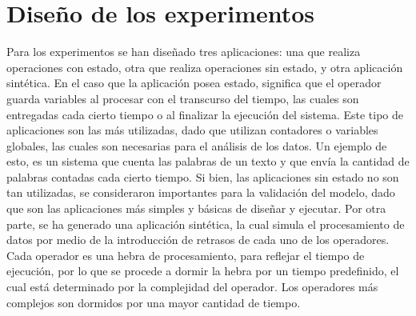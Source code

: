 

\section{Diseño de los experimentos}
Para los experimentos se han diseñado tres aplicaciones: una que realiza operaciones con estado, otra que realiza operaciones sin estado, y otra aplicación sintética. En el caso que la aplicación posea estado, significa que el operador guarda variables al procesar con el transcurso del tiempo, las cuales son entregadas cada cierto tiempo o al finalizar la ejecución del sistema. Este tipo de aplicaciones son las más utilizadas, dado que utilizan contadores o variables globales, las cuales son necesarias para el análisis de los datos. Un ejemplo de esto, es un sistema que cuenta las palabras de un texto y que envía la cantidad de palabras contadas cada cierto tiempo. Si bien, las aplicaciones sin estado no son tan utilizadas, se consideraron importantes para la validación del modelo, dado que son las aplicaciones más simples y básicas de diseñar y ejecutar. Por otra parte, se ha generado una aplicación sintética, la cual simula el procesamiento de datos por medio de la introducción de retrasos de cada uno de los operadores. Cada operador es una hebra de procesamiento, para reflejar el tiempo de ejecución, por lo que se procede a dormir la hebra por un tiempo predefinido, el cual está determinado por la complejidad del operador. Los operadores más complejos son dormidos por una mayor cantidad de tiempo.


